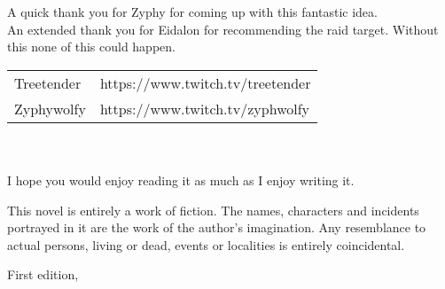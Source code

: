 
{\small
\setlength{\parindent}{0em}\setlength{\parskip}{1em}

A quick thank you for Zyphy for coming up with this fantastic idea.\\
An extended thank you for Eidalon for recommending the raid target. Without this none of this could happen.\\

\begin{tabular}{ l l }
  \hline
  Treetender & https://www.twitch.tv/treetender  \\
  Zyphywolfy & https://www.twitch.tv/zyphwolfy \\
\hline
\end{tabular}\\ \\
I hope you would enjoy reading it as much as I enjoy writing it.
\vfill




This novel is entirely a work of fiction. The names, characters and incidents portrayed in it are the work of the author’s imagination. Any resemblance to actual persons, living or dead, events or localities is entirely coincidental.

First edition, \editionyear{}

}
